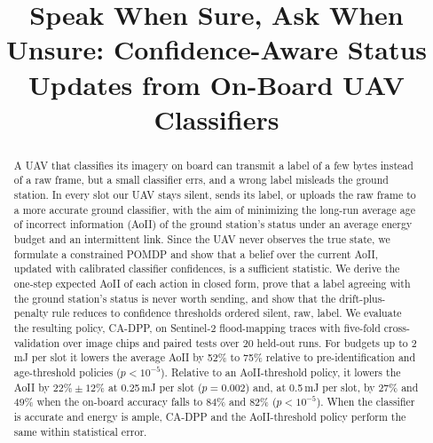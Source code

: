 \documentclass[conference]{IEEEtran}
\theoremstyle{remark}
\begin{document}
\title{Speak When Sure, Ask When Unsure: Confidence-Aware Status Updates from On-Board UAV Classifiers}

\author{
\and
{}
}

\maketitle

\begin{abstract}
A UAV that classifies its imagery on board can transmit a label of a few bytes instead of a raw frame, but a small classifier errs, and a wrong label misleads the ground station. In every slot our UAV stays silent, sends its label, or uploads the raw frame to a more accurate ground classifier, with the aim of minimizing the long-run average age of incorrect information (AoII) of the ground station's status under an average energy budget and an intermittent link. Since the UAV never observes the true state, we formulate a constrained POMDP and show that a belief over the current AoII, updated with calibrated classifier confidences, is a sufficient statistic. We derive the one-step expected AoII of each action in closed form, prove that a label agreeing with the ground station's status is never worth sending, and show that the drift-plus-penalty rule reduces to confidence thresholds ordered silent, raw, label. We evaluate the resulting policy, CA-DPP, on Sentinel-2 flood-mapping traces with five-fold cross-validation over image chips and paired tests over 20 held-out runs. For budgets up to 2\,mJ per slot it lowers the average AoII by 52\% to 75\% relative to pre-identification and age-threshold policies ($p<10^{-5}$). Relative to an AoII-threshold policy, it lowers the AoII by $22\%\pm12\%$ at 0.25\,mJ per slot ($p=0.002$) and, at 0.5\,mJ per slot, by 27\% and 49\% when the on-board accuracy falls to 84\% and 82\% ($p<10^{-5}$). When the classifier is accurate and energy is ample, CA-DPP and the AoII-threshold policy perform the same within statistical error.
\end{abstract}
\end{document}
